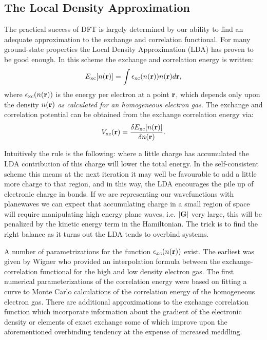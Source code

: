 \subsection{The Local Density Approximation}
\noindent
\label{sec:thelda}
The practical success of DFT is largely determined by our ability to
find an adequate approximation to the exchange and correlation functional.
For many ground-state properties the Local Density Approximation (LDA) 
has proven to be good enough. In this scheme the exchange and correlation energy
is written:
%
\begin{equation}
E_{\rm{xc}}[n({\bf r})] = \int \epsilon_{\rm{xc}}(n({\bf r}))n({\bf r})d{\bf r},
\end{equation}
%
where $\epsilon_{\rm{xc}}(n({\bf r}))$ is the energy per electron at a point ${\bf r}$,
which depends only upon the density $n({\bf r})$ \textit{as calculated for an homogeneous electron 
gas}. The exchange and correlation potential 
can be obtained from the exchange correlation energy via:
%
\begin{equation}
\label{eq:kohnshampot}
V_{\rm{xc}}({\bf r}) = \frac{\delta E_{\rm{xc}}[n({\bf r})]}{\delta n({\bf r})}.
\end{equation}
%

Intuitively the rule is the following: where a little charge has accumulated
the LDA contribution of this charge will lower the total energy. In the self-consistent
scheme this means at the next iteration it may well be favourable to add a little more
charge to that region, and in this way, the LDA encourages the pile up of electronic charge
in bonds. If we are representing our wavefunctions with planewaves we can expect that 
accumulating charge in a small region of space will require manipulating high energy plane waves,
i.e. $|{\bf G}|$ very large, this will be penalized by the kinetic energy term in the Hamiltonian. The
trick is to find the right balance as it turns out the LDA tends to overbind systems.

A number of parametrizations for the function $\epsilon_{xc}(n({\bf r}))$ exist.
The earliest was given by Wigner\cite{wigner34a} who provided an interpolation formula
between the exchange-correlation functional for the high and low density electron gas.
The first numerical parameterizations of the correlation energy were based
on fitting a curve to Monte Carlo calculations of the correlation energy
of the homogeneous electron gas\cite{ceperly80, vosko80, 
perdew81, perdewwang92}. There are additional approximations to the exchange 
correlation function which incorporate information about the gradient of the
electronic density or elements of exact exchange\cite{becke88, perdew96, becke93, becke93b}
some of which improve upon the aforementioned overbinding tendency at the expense of
increased meddling.

